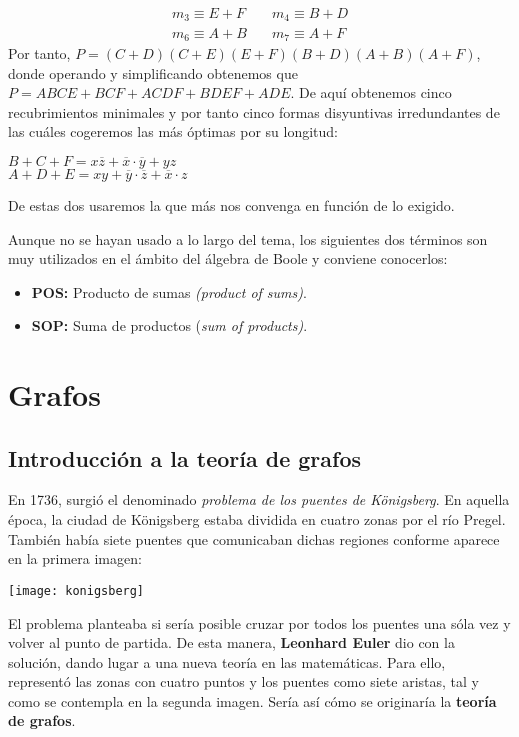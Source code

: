 \begin{ejemplo}
\begin{align*}
        m_3 \equiv E + F & \quad m_4 \equiv B + D \\
        m_6 \equiv A + B & \quad m_7 \equiv A + F
    \end{align*}
    Por tanto, $P = (C+D)(C+E)(E+F)(B+D)(A+B)(A+F)$, donde operando y simplificando obtenemos que $P = ABCE+BCF+ACDF+BDEF+ADE$.
    De aquí obtenemos cinco recubrimientos minimales y por tanto cinco formas disyuntivas irredundantes de las cuáles cogeremos las más óptimas por su longitud:
    \begin{center}
        $B+C+F=x\overline{z}+\overline{x} \cdot \overline{y}+yz$ \\ $A+D+E=xy+\overline{y} \cdot \overline{z}+\overline{x} \cdot z$
    \end{center}
    De estas dos usaremos la que más nos convenga en función de lo exigido.
\end{ejemplo}
\begin{nota}
    Aunque no se hayan usado a lo largo del tema, los siguientes dos términos son muy utilizados en el ámbito del álgebra de Boole y conviene conocerlos:
    \begin{itemize}
        \item \textbf{POS:} Producto de sumas \textit{(product of sums)}.
        \item \textbf{SOP:} Suma de productos (\textit{sum of products)}.
    \end{itemize}
\end{nota}

\newpage
\section{Grafos}
\subsection{Introducción a la teoría de grafos}
En 1736, surgió el denominado \textit{problema de los puentes de Königsberg}. En aquella época, la ciudad de Königsberg estaba dividida en cuatro zonas por el río Pregel.
También había siete puentes que comunicaban dichas regiones conforme aparece en la primera imagen:
\begin{center} \texttt{[image: konigsberg]} \end{center}
El problema planteaba si sería posible cruzar por todos los puentes una sóla vez y volver al punto de partida.
De esta manera, \textbf{Leonhard Euler} dio con la solución, dando lugar a una nueva teoría en las matemáticas. Para ello, representó las zonas con cuatro puntos y los puentes como siete aristas, tal y como se contempla en la segunda imagen.
Sería así cómo se originaría la \textbf{teoría de grafos}.

